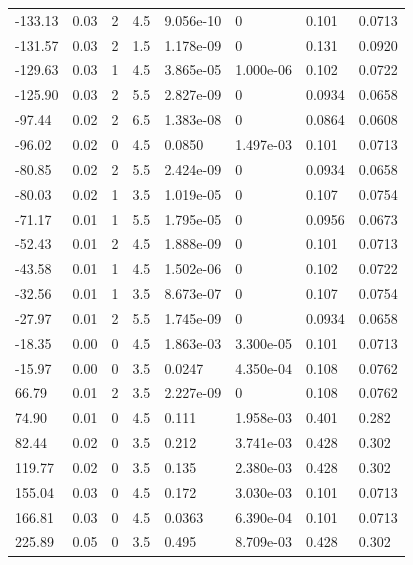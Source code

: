\documentclass[preview]{standalone}
\begin{document}
{{\begin{tabular}{L{1.2cm}C{1.2cm} C{0.3cm}C{0.5cm} C{1.4cm}C{1.4cm} C{1.4cm}C{1.4cm}}
  -133.13  &  0.03  & 2     & 4.5 &  9.056e-10  & 0  & 0.101 &  0.0713   \\ 
  -131.57  &  0.03  & 2     & 1.5 &  1.178e-09  & 0  & 0.131 &  0.0920   \\ 
  -129.63  &  0.03  & 1     & 4.5 &  3.865e-05  & 1.000e-06  & 0.102 &  0.0722   \\ 
  -125.90  &  0.03  & 2     & 5.5 &  2.827e-09  & 0  & 0.0934 &  0.0658   \\ 
  -97.44  &  0.02  & 2     & 6.5 &  1.383e-08  & 0  & 0.0864 &  0.0608   \\ 
  -96.02  &  0.02  & 0     & 4.5 &  0.0850  & 1.497e-03  & 0.101 &  0.0713   \\ 
  -80.85  &  0.02  & 2     & 5.5 &  2.424e-09  & 0  & 0.0934 &  0.0658   \\ 
  -80.03  &  0.02  & 1     & 3.5 &  1.019e-05  & 0  & 0.107 &  0.0754   \\ 
  -71.17  &  0.01  & 1     & 5.5 &  1.795e-05  & 0  & 0.0956 &  0.0673   \\ 
  -52.43  &  0.01  & 2     & 4.5 &  1.888e-09  & 0  & 0.101 &  0.0713   \\ 
  -43.58  &  0.01  & 1     & 4.5 &  1.502e-06  & 0  & 0.102 &  0.0722   \\ 
  -32.56  &  0.01  & 1     & 3.5 &  8.673e-07  & 0  & 0.107 &  0.0754   \\ 
  -27.97  &  0.01  & 2     & 5.5 &  1.745e-09  & 0  & 0.0934 &  0.0658   \\ 
  -18.35  &  0.00  & 0     & 4.5 &  1.863e-03  & 3.300e-05  & 0.101 &  0.0713   \\ 
  -15.97  &  0.00  & 0     & 3.5 &  0.0247  & 4.350e-04  & 0.108 &  0.0762   \\ 
  66.79  &  0.01  & 2     & 3.5 &  2.227e-09  & 0  & 0.108 &  0.0762   \\ 
  74.90  &  0.01  & 0     & 4.5 &  0.111  & 1.958e-03  & 0.401 &  0.282   \\ 
  82.44  &  0.02  & 0     & 3.5 &  0.212  & 3.741e-03  & 0.428 &  0.302   \\ 
  119.77  &  0.02  & 0     & 3.5 &  0.135  & 2.380e-03  & 0.428 &  0.302   \\ 
  155.04  &  0.03  & 0     & 4.5 &  0.172  & 3.030e-03  & 0.101 &  0.0713   \\ 
  166.81  &  0.03  & 0     & 4.5 &  0.0363  & 6.390e-04  & 0.101 &  0.0713   \\ 
  225.89  &  0.05  & 0     & 3.5 &  0.495  & 8.709e-03  & 0.428 &  0.302   \\ 

\end{tabular}}}
\end{document}
